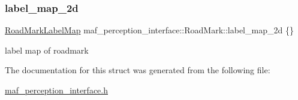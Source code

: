 \subsubsection{\texorpdfstring{label\+\_\+map\+\_\+2d}{label\_map\_2d}}
{\footnotesize\ttfamily \hyperlink{structmaf__perception__interface_1_1RoadMarkLabelMap}{Road\+Mark\+Label\+Map} maf\+\_\+perception\+\_\+interface\+::\+Road\+Mark\+::label\+\_\+map\+\_\+2d \{\}}



label map of roadmark 



The documentation for this struct was generated from the following file\+:\begin{DoxyCompactItemize}
\item 
\hyperlink{maf__perception__interface_8h}{maf\+\_\+perception\+\_\+interface.\+h}\end{DoxyCompactItemize}

